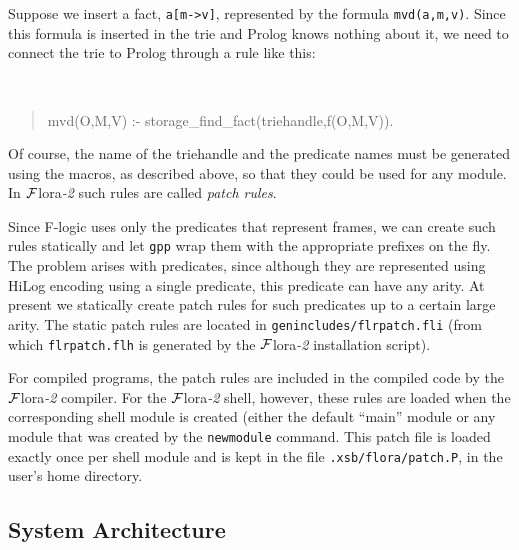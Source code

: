 \documentclass[11pt]{article}
\newcommand{\FLSYSTEM}{{\mbox{\sc ${\cal F}${lora}\rm\emph{-2}}}\xspace}
\newcommand{\fl}{\mbox{F-logic}\xspace}
\begin{document}
Suppose we insert a fact, {\tt a[m->v]}, represented by the formula
{\tt mvd(a,m,v)}. Since this formula is inserted in the trie and Prolog knows
nothing about it, we need to connect the trie to Prolog through a rule like
this:
{\tt
\begin{quote}
  mvd(O,M,V) :- storage\_find\_fact(triehandle,f(O,M,V)).
\end{quote}
}
Of course, the name of the triehandle and the predicate names must be
generated using the macros, as described above, so that they could be used
for any module. In \FLSYSTEM such rules are called \emph{patch rules}. 

Since \fl uses only the predicates that represent frames, we can
create such rules statically and let {\tt gpp} wrap them with the
appropriate prefixes on the fly.  The problem arises with predicates, since
although they are represented using HiLog encoding using a single
predicate, this predicate can have any arity.  At present we statically
create patch rules for such predicates up to a certain large arity.  The
static patch rules are located in {\tt genincludes/flrpatch.fli} (from
which {\tt flrpatch.flh} is generated by the \FLSYSTEM installation script).

For compiled programs, the patch rules are included in the compiled code
by the \FLSYSTEM compiler. For the \FLSYSTEM shell, however, these rules are
loaded when the corresponding shell module is created (either the default
``main'' module or any module that was created by the {\tt newmodule}
command. This patch file is loaded exactly once per shell module and is
kept in the file {\tt .xsb/flora/patch.P}, in the user's home directory.


\subsection{System Architecture}
\end{document}
